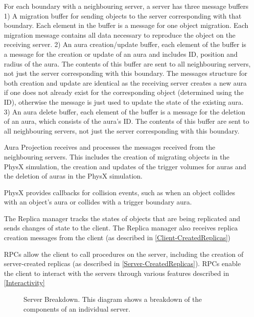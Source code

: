 For each boundary with a neighbouring server, a server has three message buffers 1) A migration buffer for sending objects to the server corresponding with that boundary. Each element in the buffer is a message for one object migration. Each migration message contains all data necessary to reproduce the object on the receiving server. 2) An aura creation/update buffer, each element of the buffer is a message for the creation or update of an aura and includes ID, position and radius of the aura. The contents of this buffer are sent to all neighbouring servers, not just the server corresponding with this boundary. The messages structure for both creation and update are identical as the receiving server creates a new aura if one does not already exist for the corresponding object (determined using the ID), otherwise the message is just used to update the state of the existing aura. 3) An aura delete buffer, each element of the buffer is a message for the deletion of an aura, which consists of the aura's ID. The contents of this buffer are sent to all neighbouring servers, not just the server corresponding with this boundary.

Aura Projection receives and processes the messages received from the neighbouring servers. This includes the creation of migrating objects in the PhysX simulation, the creation and updates of the trigger volumes for auras and the deletion of auras in the PhysX simulation.

PhysX provides callbacks for collision events, such as when an object collides with an object's aura or collides with a trigger boundary aura.

The Replica manager tracks the states of objects that are being replicated and sends changes of state to the client. The Replica manager also receives replica creation messages from the client (as described in \ref{Client-CreatedReplicas})

RPCs allow the client to call procedures on the server, including the creation of server-created replicas (as described in \ref{Server-CreatedReplicas}). RPCs enable the client to interact with the servers through various features described in \ref{Interactivity}

\begin{figure}[t]
	\centering
	\resizebox{\linewidth}{!}{}
	\caption{Server Breakdown. This diagram shows a breakdown of the components of an individual server.}
	\label{fig_stack}
\end{figure}

